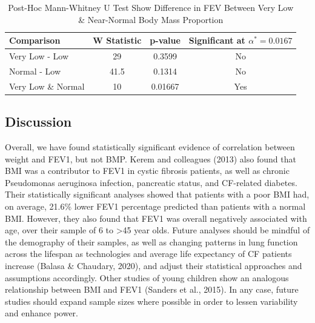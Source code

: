 \documentclass{article}
\begin{document}
		\begin{table}[h!]
			\centering
			\caption{Post-Hoc Mann-Whitney U Test Show Difference in FEV Between Very Low \& Near-Normal Body Mass Proportion}
			\footnotesize
			\begin{tabular}{l c c c}
			\toprule
			\textbf{Comparison} & \textbf{W Statistic} & \textbf{p-value} & \textbf{Significant at $\alpha^* = 0.0167$} \\
			\midrule
			Very Low - Low      & 29                   & 0.3599          & No  \\
			Normal - Low        & 41.5                 & 0.1314          & No  \\
			Very Low \& Normal  & 10                   & 0.01667         & Yes \\
			\bottomrule
			\end{tabular}
		\end{table}

		\subsection*{Discussion}
		Overall, we have found statistically significant evidence of correlation between weight and FEV1, but not BMP. Kerem and colleagues (2013) also found that BMI was a contributor to FEV1 in cystic fibrosis patients, as well as chronic Pseudomonas aeruginosa infection, pancreatic status, and CF-related diabetes. Their statistically significant analyses showed that patients with a poor BMI had, on average, 21.6\% lower FEV1 percentage predicted than patients with a normal BMI. However, they also found that FEV1 was overall negatively associated with age, over their sample of 6 to >45 year olds. Future analyses should be mindful of the demography of their samples, as well as changing patterns in lung function across the lifespan as technologies and average life expectancy of CF patients increase (Balasa \& Chaudary, 2020), and adjust their statistical approaches and assumptions accordingly. Other studies of young children show an analogous relationship between BMI and FEV1 (Sanders et al., 2015). In any case, future studies should expand sample sizes where possible in order to lessen variability and enhance power.
		
		\newpage
\end{document}
